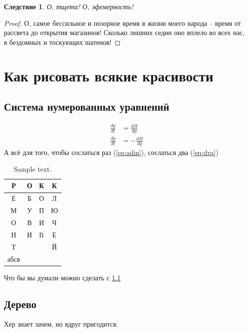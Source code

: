 \documentclass[14pt, a4paper, russian]{report}
\newtheorem{corollary}{\indent Следствие}
\begin{document}
\begin{normalsize}
\begin{corollary}\label{cor:erofeev}
О, тщета! О, эфемерность! 
\end{corollary}
\begin{proof}
О, самое бессильное и позорное время в жизни моего народа – время от рассвета до открытия магазинов! Сколько лишних седин оно вплело во всех нас, в бездомных и тоскующих шатенов!
\end{proof}

\chapter{Как рисовать всякие красивости}

\section{Система нумерованных уравнений}
\begin{align}
\label{eq:adin} \frac{dq}{dt} &= \frac{dH}{dp} \\
\label{eq:dva} \frac{dp}{dt} &= -\frac{dH}{dq}
\end{align}
А всё для того, чтобы сослаться раз (\ref{eq:adin}), сослаться два (\ref{eq:dva})
\begin{table}[H]\label{table:rokk_ebol}
\begin{small}
\begin{center}
\begin{tabular}{|c|c|c|c|}
\hline
Р & О & К & К\\
\hline
Е & Б & О & Л\\
\hline
М & У & П & Ю\\
\hline
О & В & И & Ч\\
\hline
Н & И & R & Е\\
\hline
Т &   &   & Й\\
абсв & & & \\
\hline
\end{tabular}
\end{center}
\end{small}
\caption{ Sample text.}

\end{table}

Что бы вы думали можно сделать с \cref{table:rokk_ebol}

\section{Дерево}
Хер знает зачем, но вдруг пригодится.


\end{normalsize}
\end{document}
